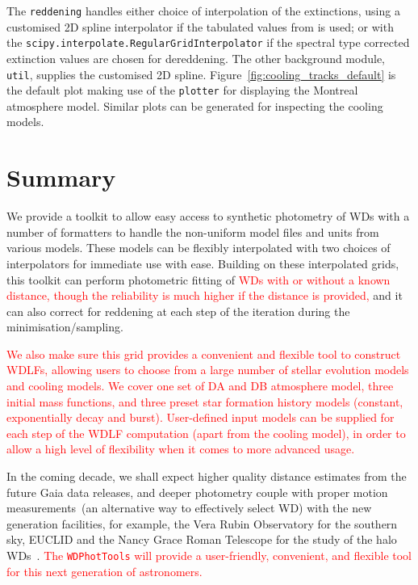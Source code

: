 \documentclass[fleqn,usenatbib]{rasti}
\begin{document}
The \texttt{reddening} handles either choice of interpolation of the
extinctions, using a customised 2D spline interpolator if the tabulated values
from \citet{2011ApJ...737..103S} is used; or with the
\verb+scipy.interpolate.RegularGridInterpolator+ if the spectral type corrected
extinction values are chosen for dereddening. The other background module,
\texttt{util}, supplies the customised 2D spline.
Figure~\ref{fig:cooling_tracks_default} is the default plot making use of the
\texttt{plotter} for displaying the Montreal atmosphere model. Similar
plots can be generated for inspecting the cooling models.

\section{Summary}
We provide a toolkit to allow easy access to synthetic photometry of WDs with
a number of formatters to handle the non-uniform model files and units from
various models. These models can be flexibly interpolated with two choices of
interpolators for immediate use with ease. Building on these interpolated
grids, this toolkit can perform photometric fitting of \textcolor{red}{WDs with
or without a known distance, though the reliability is much higher if the distance is provided,} and
it can also correct for reddening at each step of the iteration during the
minimisation/sampling.

\textcolor{red}{We also make sure this grid provides a convenient and flexible
tool to construct WDLFs, allowing users to choose from a large number of
stellar evolution models and cooling models. We cover one set of DA and DB
atmosphere model, three initial mass functions, and three preset star formation
history models (constant, exponentially decay and burst). User-defined input
models can be supplied for each step of the WDLF computation (apart from
the cooling model), in order to allow a high level of flexibility when it
comes to more advanced usage.}

In the coming decade, we shall expect higher quality distance estimates from
the future Gaia data releases, and deeper photometry couple with proper
motion measurements~(an alternative way to effectively select WD) with the
new generation facilities, for example, the Vera Rubin Observatory for the
southern sky, EUCLID and the Nancy Grace Roman Telescope for the study of the
halo WDs~\citep{2020ApJ...900..139F}. \textcolor{red}{The \texttt{WDPhotTools} will provide a user-friendly, convenient, and flexible tool for this next generation of astronomers.}
\end{document}
